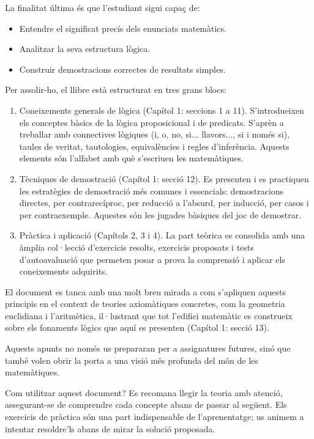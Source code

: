 \documentclass[12pt,a4paper,oneside]{book}
\begin{document}
La finalitat última és que l'estudiant sigui capaç de:
\begin{itemize}
\item Entendre el significat precís dels enunciats matemàtics.
\item Analitzar la seva estructura lògica.
\item Construir demostracions correctes de resultats simples.
\end{itemize}

Per assolir-ho, el llibre està estructurat en tres grans blocs:
\begin{enumerate}
\item Coneixements generals de lògica (Capítol 1: seccions 1 a 11). S'introdueixen els conceptes bàsics de la lògica proposicional i de predicats. S'aprèn a treballar amb connectives lògiques (i, o, no, si... llavors..., si i només si), taules de veritat, tautologies, equivalències i regles d'inferència. Aquests elements són l'alfabet amb què s'escriuen les matemàtiques.
\item Tècniques de demostració (Capítol 1: secció 12). Es presenten i es practiquen les estratègies de demostració més comunes i essencials: demostracions directes, per contrarecíproc, per reducció a l'absurd, per inducció, per casos i per contraexemple. Aquestes són les jugades bàsiques del joc de demostrar.
\item Pràctica i aplicació (Capítols 2, 3 i 4). La part teòrica es consolida amb una àmplia col·lecció d'exercicis resolts, exercicis proposats i tests d'autoavaluació que permeten posar a prova la comprensió i aplicar els coneixements adquirits.
\end{enumerate}

El document es tanca amb una molt breu mirada a com s'apliquen aquests principis en el context de teories axiomàtiques concretes, com la geometria euclidiana i l'aritmètica, il·lustrant que tot l'edifici matemàtic es construeix sobre els fonaments lògics que aquí es presenten (Capítol 1: secció 13).

Aquests apunts no només us prepararan per a assignatures futures, sinó que també volen obrir la porta a una visió més profunda del món de les matemàtiques.

Com utilitzar aquest document? Es recomana llegir la teoria amb atenció, assegurant-se de comprendre cada concepte abans de passar al següent. Els exercicis de pràctica són una part indispensable de l'aprenentatge; us animem a intentar resoldre'ls abans de mirar la solució proposada.
\end{document}
